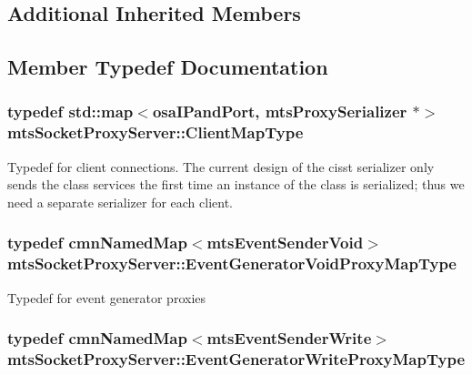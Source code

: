 \subsection*{Additional Inherited Members}


\subsection{Member Typedef Documentation}
\hypertarget{classmts_socket_proxy_server_a7119b8c41d2a72f7234f77bdcc1e2fad}{
\subsubsection[{Client\-Map\-Type}]{\setlength{\rightskip}{0pt plus 5cm}typedef std\-::map$<${\bf osa\-I\-Pand\-Port}, mts\-Proxy\-Serializer $\ast$$>$ {\bf mts\-Socket\-Proxy\-Server\-::\-Client\-Map\-Type}\hspace{0.3cm}{\ttfamily [protected]}}}\label{classmts_socket_proxy_server_a7119b8c41d2a72f7234f77bdcc1e2fad}
Typedef for client connections. The current design of the cisst serializer only sends the class services the first time an instance of the class is serialized; thus we need a separate serializer for each client. \hypertarget{classmts_socket_proxy_server_ae784ef6005901f988064e99f28bc4dc4}{
\subsubsection[{Event\-Generator\-Void\-Proxy\-Map\-Type}]{\setlength{\rightskip}{0pt plus 5cm}typedef {\bf cmn\-Named\-Map}$<$mts\-Event\-Sender\-Void$>$ {\bf mts\-Socket\-Proxy\-Server\-::\-Event\-Generator\-Void\-Proxy\-Map\-Type}\hspace{0.3cm}{\ttfamily [protected]}}}\label{classmts_socket_proxy_server_ae784ef6005901f988064e99f28bc4dc4}
Typedef for event generator proxies \hypertarget{classmts_socket_proxy_server_a54071862784d4a4b6b75588e5c03df14}{
\subsubsection[{Event\-Generator\-Write\-Proxy\-Map\-Type}]{\setlength{\rightskip}{0pt plus 5cm}typedef {\bf cmn\-Named\-Map}$<$mts\-Event\-Sender\-Write$>$ {\bf mts\-Socket\-Proxy\-Server\-::\-Event\-Generator\-Write\-Proxy\-Map\-Type}\hspace{0.3cm}{\ttfamily [protected]}}}\label{classmts_socket_proxy_server_a54071862784d4a4b6b75588e5c03df14}
